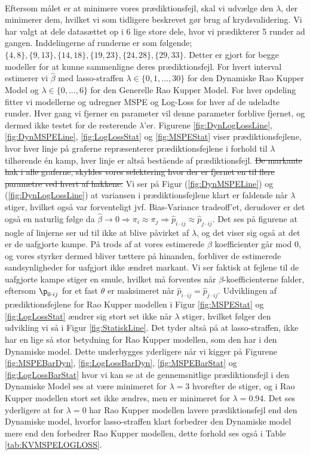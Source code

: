 \documentclass[11pt,a4paper]{article}
\begin{document}
\\Eftersom målet er at minimere vores prædiktionsfejl, skal vi udvælge den $\lambda$, der minimerer dem, hvilket vi som tidligere beskrevet gør brug af krydsvalidering. Vi har valgt at dele datasættet op i 6 lige store dele, hvor vi prædikterer 5 runder ad gangen. Inddelingerne af runderne er som følgende; $\{4,8\},\{9,13\},\{14,18\},\{19,23\},\{24,28\},\{29,33\}$. Detter er gjort for begge modeller for at kunne sammenligne deres prædiktionsfejl. For hvert interval estimerer vi $\hat{\beta}$ med lasso-straffen $\lambda \in \{0,1,...,30\}$ for den Dynamiske Rao Kupper Model og $\lambda \in \{0,...,6\}$ for den Generelle Rao Kupper Model. For hver opdeling fitter vi modellerne og udregner MSPE og Log-Loss for hver af de udeladte runder. Hver gang vi fjerner en parameter vil denne parameter forblive fjernet, og dermed ikke testet for de resterende $\lambda$'er. Figurene \ref{fig:DynLogLossLine},  \ref{fig:DynMSPELine}, \ref{fig:LogLossStat} og \ref{fig:MSPEStat} viser prædiktionsfejlene, hvor hver linje på graferne repræsenterer prædiktionsfejlene i forhold til $\lambda$ tilhørende én kamp, hver linje er altså bestående af  prædiktionsfejl. \sout{De markante hak i alle graferne, skyldes vores selektering hvor der er fjernet en til flere parametre ved hvert af hakkene.} Vi ser på Figur (\ref{fig:DynMSPELine}) og (\ref{fig:DynLogLossLine}) at variansen i prædiktionsfejlene klart er faldende når $\lambda$ stiger, hvilket også var forventeligt jvf. Bias-Variance tradeoff'et, derudover er det også en naturlig følge da $\hat{\beta} \rightarrow 0 \Rightarrow \pi_i \approx \pi_j \Rightarrow \hat{p}_{i\cdot ij} \approx \hat{p}_{j \cdot ij}$. Det ses på figurene at nogle af linjerne ser ud til ikke at blive påvirket af $\lambda$, og det viser sig også at det er de uafgjorte kampe. På trods af at vores estimerede $\beta$ koefficienter går mod $0$, og vores styrker dermed bliver tættere på hinanden, forbliver de estimerede sandsynligheder for uafgjort ikke ændret markant. Vi ser faktisk at fejlene til de uafgjorte kampe stiger en smule, hvilket må forventes når $\beta$-koefficienterne falder, eftersom $\p_{0 \cdot ij}$ for et fast $\theta$ er maksimeret når $\hat{p}_{i\cdot ij} = \hat{p}_{j \cdot ij}$. Udviklingen af prædiktionsfejlene for Rao Kupper modellen i Figur \ref{fig:MSPEStat} og \ref{fig:LogLossStat} ændrer sig stort set ikke når $\lambda$ stiger, hvilket følger den udvikling vi så i Figur \ref{fig:StatiskLine}. Det tyder altså på at lasso-straffen, ikke har en lige så stor betydning for Rao Kupper modellen, som den har i den Dynamiske model. Dette underbygges yderligere når vi kigger på Figurene \ref{fig:MSPEBarDyn}, \ref{fig:LogLossBarDyn}, \ref{fig:MSPEBarStat} og \ref{fig:LogLossBarStat} hvor vi kan se at de gennemsnitlige prædiktionsfejl i den Dynamiske Model ses at være minimeret for $\lambda = 3$ hvorefter de stiger, og i Rao Kupper modellen stort set ikke ændres, men er minimeret for $\lambda = 0.94$. Det ses yderligere at for $\lambda = 0$ har Rao Kupper modellen lavere prædiktionsfejl end den Dynamiske model, hvorfor lasso-straffen klart forbedrer den Dynamiske model mere end den forbedrer Rao Kupper modellen, dette forhold ses også i Table \ref{tab:KVMSPELOGLOSS}. \\
\end{document}
